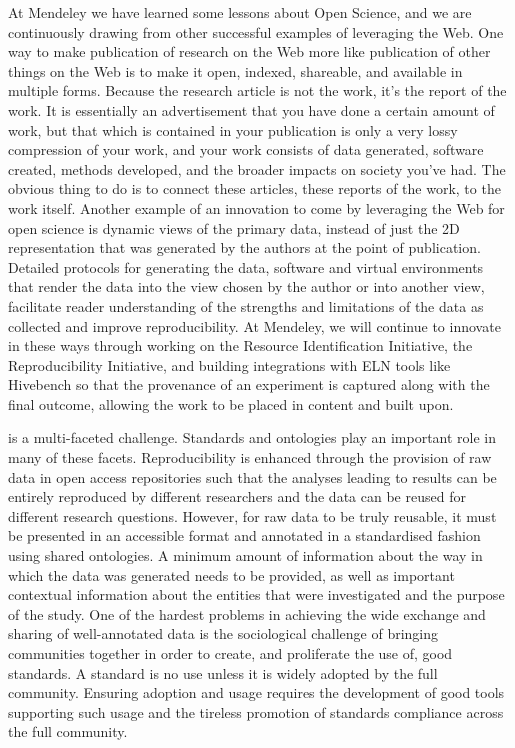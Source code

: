 \documentclass[a4paper,USenglish]{dagrep}
\begin{document}
At Mendeley we have learned some lessons about Open Science, and we are
continuously drawing from other successful examples of leveraging the Web. One
way to make publication of research on the Web more like publication of other
things on the Web is to make it open, indexed, shareable, and available in
multiple forms. Because the research article is not the work, it's the report of
the work. It is essentially an advertisement that you have done a certain amount
of work, but that which is contained in your publication is only a very lossy
compression of your work, and your work consists of data generated, software
created, methods developed, and the broader impacts on society you've had. The
obvious thing to do is to connect these articles, these reports of the work, to
the work itself. Another example of an innovation to come by leveraging the Web
for open science is dynamic views of the primary data, instead of just the 2D
representation that was generated by the authors at the point of publication.
Detailed protocols for generating the data, software and virtual environments
that render the data into the view chosen by the author or into another view,
facilitate reader understanding of the strengths and limitations of the data as
collected and improve reproducibility. At Mendeley, we will continue to innovate
in these ways through working on the Resource Identification Initiative, the
Reproducibility Initiative, and building integrations with ELN tools like
Hivebench so that the provenance of an experiment is captured along with the
final outcome, allowing the work to be placed in content and built upon.
 


{}
\license
 is a multi-faceted challenge. Standards and ontologies play an important role
in many of these facets. Reproducibility is enhanced through the provision of
raw data in open access repositories such that the analyses leading to results
can be entirely reproduced by different researchers and the data can be reused
for different research questions. However, for raw data to be truly reusable, it
must be presented in an accessible format and annotated in a standardised
fashion using shared ontologies. A minimum amount of information about the way
in which the data was generated needs to be provided, as well as important
contextual information about the entities that were investigated and the purpose
of the study. One of the hardest problems in achieving the wide exchange and
sharing of well-annotated data is the sociological challenge of bringing
communities together in order to create, and proliferate the use of, good
standards. A standard is no use unless it is widely adopted by the full
community. Ensuring adoption and usage requires the development of good tools
supporting such usage and the tireless promotion of standards compliance across
the full community. 
\end{document}
